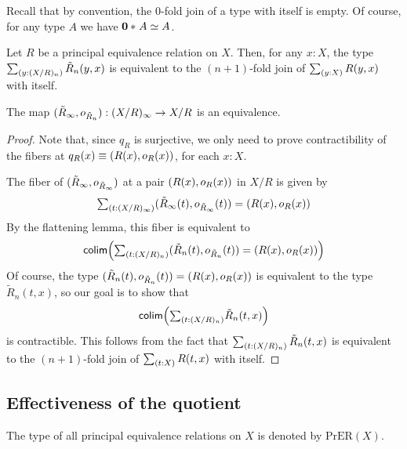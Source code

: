 Recall that by convention, the $0$-fold join of a type with itself is empty. Of course, for any type $A$ we have ${\mathbf{0}}\ast_{}{A}\simeq A$. 

\begin{cor}
Let $R$ be a principal equivalence relation on $X$. Then, for any $x:X$, the type $\sm{y:(X/R)_n}\tilde{R}_n(y,x)$ is equivalent to the $(n+1)$-fold join of $\sm{y:X}R(y,x)$ with itself. 
\end{cor}

\begin{thm}\label{thm:quotients_are_small}
The map ${\mathopen{}(\tilde{R}_\infty,o_{\tilde{R}_n})\mathclose{}}:(X/R)_\infty \to X/R$ is an equivalence. 
\end{thm}

\begin{proof}
Note that, since $q_R$ is surjective, we only need to prove contractibility of the fibers at $q_R(x)\equiv{\mathopen{}(R(x),o_R(x))\mathclose{}}$, for each $x:X$. 

The fiber of ${\mathopen{}(\tilde{R}_\infty,o_{\tilde{R}_\infty})\mathclose{}}$ at a pair ${\mathopen{}(R(x),o_R(x))\mathclose{}}$ in $X/R$ is given by
\begin{equation*}
\sm{t:(X/R)_\infty} \pairr{\tilde{R}_\infty(t),o_{\tilde{R}_\infty}(t)}=\pairr{R(x),o_R(x)}
\end{equation*}
By the flattening lemma, this fiber is equivalent to
\begin{equation*}
\tfcolim\Big(\sm{t:(X/R)_n} \pairr{\tilde{R}_n(t),o_{\tilde{R}_n}(t)}=\pairr{R(x),o_R(x)}\Big)
\end{equation*}
Of course, the type ${\mathopen{}(\tilde{R}_n(t),o_{\tilde{R}_n}(t))\mathclose{}}={\mathopen{}(R(x),o_R(x))\mathclose{}}$ is equivalent to the type $\tilde{R}_n(t,x)$, so our goal is to show that
\begin{equation*}
\tfcolim\Big(\sm{t:(X/R)_n}\tilde{R}_n(t,x)\Big)
\end{equation*}
is contractible. This follows from the fact that $\sm{t:(X/R)_n}\tilde{R}_n(t,x)$ is equivalent to the $(n+1)$-fold join of $\sm{t:X}R(t,x)$ with itself.
\end{proof}

\subsection{Effectiveness of the quotient}

\begin{defn}
The type of all principal equivalence relations on $X$ is denoted by $\mathrm{PrER}(X)$. 
\end{defn}

